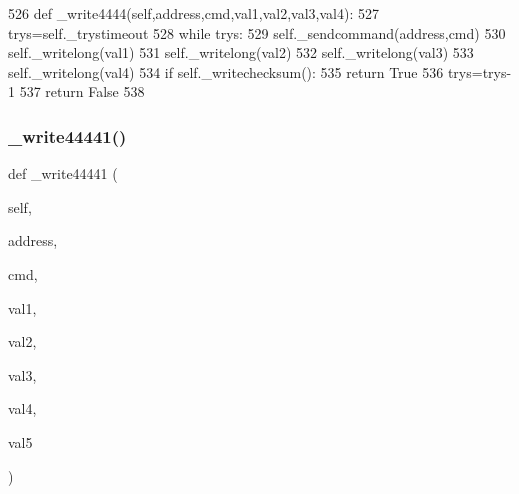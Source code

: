 \begin{DoxyCode}
526     \textcolor{keyword}{def }\_write4444(self,address,cmd,val1,val2,val3,val4):
527         trys=self.\_trystimeout
528         \textcolor{keywordflow}{while} trys:
529             self.\_sendcommand(address,cmd)
530             self.\_writelong(val1)
531             self.\_writelong(val2)
532             self.\_writelong(val3)
533             self.\_writelong(val4)
534             \textcolor{keywordflow}{if} self.\_writechecksum():
535                 \textcolor{keywordflow}{return} \textcolor{keyword}{True}
536             trys=trys-1
537         \textcolor{keywordflow}{return} \textcolor{keyword}{False}
538 
\end{DoxyCode}
\mbox{\label{classtoxic__hardware_1_1roboclaw__3_1_1Roboclaw_a3276351c3285e97da9390e30d85ea855}} 
\subsubsection{\texorpdfstring{\+\_\+write44441()}{\_write44441()}}
{\footnotesize\ttfamily def \+\_\+write44441 (\begin{DoxyParamCaption}\item[{}]{self,  }\item[{}]{address,  }\item[{}]{cmd,  }\item[{}]{val1,  }\item[{}]{val2,  }\item[{}]{val3,  }\item[{}]{val4,  }\item[{}]{val5 }\end{DoxyParamCaption})\hspace{0.3cm}{\ttfamily [private]}}


